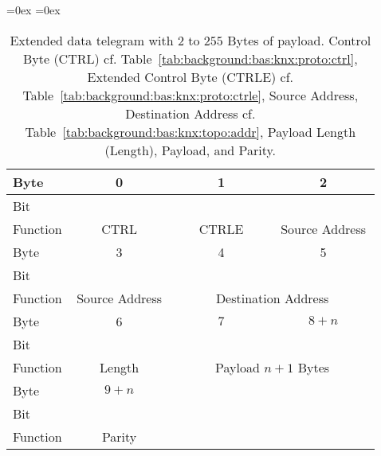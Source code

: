 		\begin{table}
			\aboverulesep=0ex
			\belowrulesep=0ex
			\renewcommand{\arraystretch}{1.2}
			
			\centering
			\begin{tabular}{|l|c|c|c|c|c|c|c|c|c|c|c|c|c|c|c|c|c|c|c|c|c|c|c|c|}
				\toprule
				Byte & \multicolumn{8}{c|}{0} & \multicolumn{8}{c|}{1} & \multicolumn{8}{c|}{2} \\\midrule
				Bit & & & & & & & & & & & & & & & & & & & & & & & & \\\midrule
				Function & \multicolumn{8}{c|}{CTRL} & \multicolumn{8}{c|}{CTRLE} & \multicolumn{8}{c|}{Source Address} \\\bottomrule
				\toprule
				Byte & \multicolumn{8}{c|}{3} & \multicolumn{8}{c|}{4} & \multicolumn{8}{c|}{5} \\\midrule
				Bit & & & & & & & & & & & & & & & & & & & & & & & & \\\midrule
				Function & \multicolumn{8}{c|}{Source Address} & \multicolumn{16}{c|}{Destination Address} \\\bottomrule
				\toprule
				Byte & \multicolumn{8}{c|}{6} & \multicolumn{8}{c|}{$7$} & \multicolumn{8}{c|}{$8+n$} \\\midrule
				Bit & & & & & & & & & & & & & & & & & & & & & & & & \\\midrule
				Function & \multicolumn{8}{c|}{Length} & \multicolumn{16}{c|}{Payload $n+1$ Bytes} \\\bottomrule
				\toprule
				Byte & \multicolumn{8}{c|}{$9+n$} & \multicolumn{16}{c|}{ } \\\cmidrule{1-9}
				Bit & & & & & & & & & \multicolumn{16}{c|}{ } \\\cmidrule{1-9}
				Function & \multicolumn{8}{c|}{Parity} & \multicolumn{16}{c|}{ } \\\bottomrule
			\end{tabular}
			\caption[Extended \knx data telegram]{Extended \knx data telegram with $2$ to $255$ Bytes of payload. Control Byte (CTRL) cf. Table~\ref{tab:background:bas:knx:proto:ctrl}, Extended Control Byte (CTRLE) cf. Table~\ref{tab:background:bas:knx:proto:ctrle}, Source Address, Destination Address cf. Table~\ref{tab:background:bas:knx:topo:addr}, Payload Length (Length), Payload, and Parity.}
			\label{tab:background:bas:knx:proto:knx-extended}
		\end{table}
		
